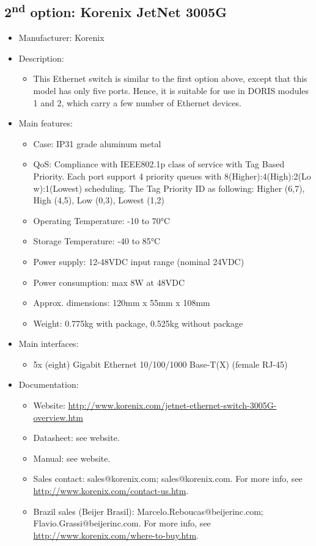 \subsection{2\textsuperscript{nd} option: Korenix JetNet 3005G} \label{DEVICE:ETHERNETSWITCH3005G}
\begin{itemize}
  \item Manufacturer: Korenix
  \item Description:
  \begin{itemize}
    \item This Ethernet switch is similar to the first option above, except that this model has only five ports. Hence, it is suitable for use in DORIS modules 1 and 2, which carry a few number of Ethernet devices.
  \end{itemize}
  \item Main features:
  \begin{itemize}
    \item Case: IP31 grade aluminum metal
    \item QoS: Compliance with IEEE802.1p class of service with Tag Based Priority. Each port support 4 priority queues with 8(Higher):4(High):2(Lo w):1(Lowest) scheduling. The Tag Priority ID as following: Higher (6,7), High (4,5), Low (0,3), Lowest (1,2)
    \item Operating Temperature: -10 to 70°C
    \item Storage Temperature: -40 to 85°C
    \item Power supply: 12-48VDC input range (nominal 24VDC)
    \item Power consumption: max 8W at 48VDC
    \item Approx. dimensions: 120mm x 55mm x 108mm
    \item Weight: 0.775kg with package, 0.525kg without package
  \end{itemize}
  \item Main interfaces:
  \begin{itemize}
    \item 5x (eight) Gigabit Ethernet 10/100/1000 Base-T(X) (female RJ-45)
  \end{itemize}
  \item Documentation:
  \begin{itemize}
    \item Website: \href{http://www.korenix.com/jetnet-ethernet-switch-3005G-overview.htm}{http://www.korenix.com/jetnet-ethernet-switch-3005G-overview.htm}
    \item Datasheet: see website.
    \item Manual: see website.
    \item Sales contact: sales@korenix.com; sales@korenix.com. For more info, see \href{http://www.korenix.com/contact-us.htm}{http://www.korenix.com/contact-us.htm}.
    \item Brazil sales (Beijer Brasil): Marcelo.Reboucas@beijerinc.com; Flavio.Grassi@beijerinc.com. For more info, see \href{http://www.korenix.com/where-to-buy.htm}{http://www.korenix.com/where-to-buy.htm}.
  \end{itemize}
\end{itemize}
